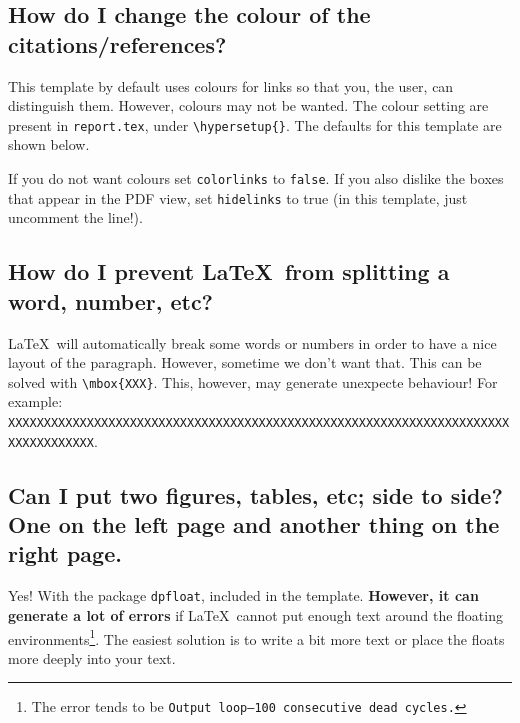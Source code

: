 \subsection{How do I change the colour of the citations/references?}

This template by default uses colours for links so that you, the user, can distinguish them. However, colours may not be wanted. The colour setting are present in \texttt{report.tex}, under \verb|\hypersetup{}|. The defaults for this template are shown below.

If you do not want colours set \verb|colorlinks| to \verb|false|. If you also dislike the boxes that appear in the PDF view, set \verb|hidelinks| to true (in this template, just uncomment the line!).

\begin{TeXlstlisting}
\hypersetup{
	colorlinks = true, %
	citecolor = red,
	urlcolor = blue,
	linkcolor = red,
} %
\end{TeXlstlisting}

\subsection{How do I prevent \LaTeX\ from splitting a word, number, etc?}

\LaTeX\ will automatically break some words or numbers in order to have a nice layout of the paragraph. However, sometime we don't want that. This can be solved with \verb|\mbox{XXX}|. This, however, may generate unexpecte behaviour! For example: \mbox{\texttt{XXXXXXXXXXXXXXXXXXXXXXXXXXXXXXXXXXXXXXXXXXXXXXXXXXXXXXXXXXXXXXXXXXXXXXXXXXXXXXXXXX}}.

\subsection[Can I put two figures, tables, etc; side to side?]{Can I put two figures, tables, etc; side to side? One on the left page and another thing on the right page.}

Yes! With the package \verb|dpfloat|, included in the template. \textbf{However, it can generate a lot of errors} if \LaTeX\ cannot put enough text around the floating environments\footnote{The error tends to be \texttt{Output loop---100 consecutive dead cycles.}}. The easiest solution is to write a bit more text or place the floats more deeply into your text.

